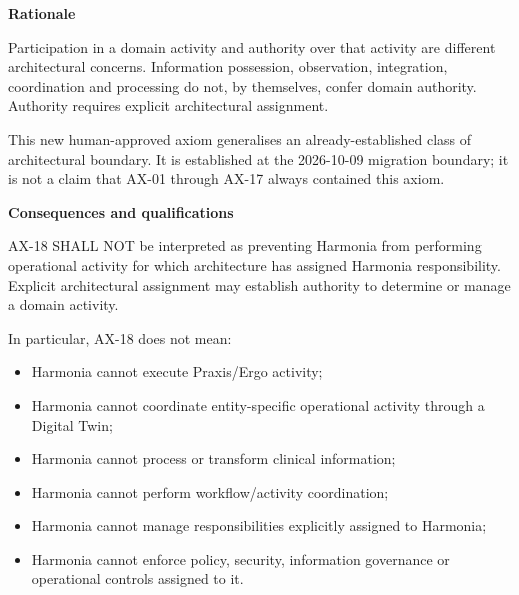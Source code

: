 \par\medskip\textbf{Rationale}\par


Participation in a domain activity and authority over that activity are
different architectural concerns. Information possession, observation,
integration, coordination and processing do not, by themselves, confer
domain authority. Authority requires explicit architectural assignment.



This new human-approved axiom generalises an already-established class of
architectural boundary. It is established at the 2026-10-09 migration
boundary; it is not a claim that AX-01 through AX-17 always contained this
axiom.



\par\medskip\textbf{Consequences and qualifications}\par


AX-18 SHALL NOT be interpreted as preventing Harmonia from performing
operational activity for which architecture has assigned Harmonia
responsibility. Explicit architectural assignment may establish authority
to determine or manage a domain activity.



In particular, AX-18 does not mean:



\begin{itemize}


\item Harmonia cannot execute Praxis/Ergo activity;

\item Harmonia cannot coordinate entity-specific operational activity through a Digital Twin;

\item Harmonia cannot process or transform clinical information;

\item Harmonia cannot perform workflow/activity coordination;

\item Harmonia cannot manage responsibilities explicitly assigned to Harmonia;

\item Harmonia cannot enforce policy, security, information governance or operational controls assigned to it.

\end{itemize}


